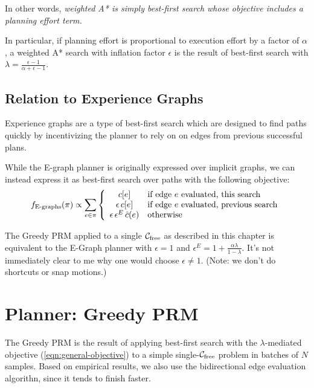 \documentclass{report}
\begin{document}
In other words,
\emph{weighted A* is simply best-first search whose objective
   includes a planning effort term.}

In particular, if planning effort is proportional to execution
effort by a factor of $\alpha$,
a weighted A* search with inflation factor $\epsilon$
is the result of best-first search with
$\lambda = \frac{\epsilon-1}{\alpha+\epsilon-1}$.

\subsection{Relation to Experience Graphs}
\label{sec:egraphs}

Experience graphs \cite{phillips2012egraphs}
are a type of best-first search which
are designed to find paths quickly by incentivizing the planner
to rely on on edges from previous successful plans.

While the E-graph planner is originally expressed over implicit graphs,
we can instead express it as best-first search over paths
with the following objective:
\begin{equation}
   f_{\mbox{\scriptsize E-graphs}}(\pi) \propto \sum_{e \in \pi} \left\{
   \begin{array}{cl}
      c[e] & \mbox{if edge } e \mbox{ evaluated, this search} \\
      \epsilon \, c[e] & \mbox{if edge } e \mbox{ evaluated, previous search} \\
     \epsilon \, \epsilon^E \, \hat{c}(e) & \mbox{otherwise} \\
   \end{array}
   \right.
   \label{eqn:prop-heuristics}
\end{equation}

The Greedy PRM applied to a single
$\mathcal{C}_{\mbox{\scriptsize free}}$ as described in this chapter
is equivalent to the E-Graph planner
with $\epsilon=1$ and $\epsilon^E = 1 + \frac{\alpha \lambda}{1-\lambda}$.
It's not immediately clear to me why one would choose $\epsilon \neq 1$.
(Note: we don't do shortcuts or snap motions.)

\section{Planner: Greedy PRM}
\label{sec:greedy-prm}

The Greedy PRM is the result of applying
best-first search with the $\lambda$-mediated objective
(\ref{eqn:general-objective})
to a simple single-$\mathcal{C}_{\mbox{\scriptsize free}}$ problem
in batches of $N$ samples.
Based on empirical results, we also use the bidirectional edge evaluation
algorithn,
since it tends to finish faster.
\end{document}
